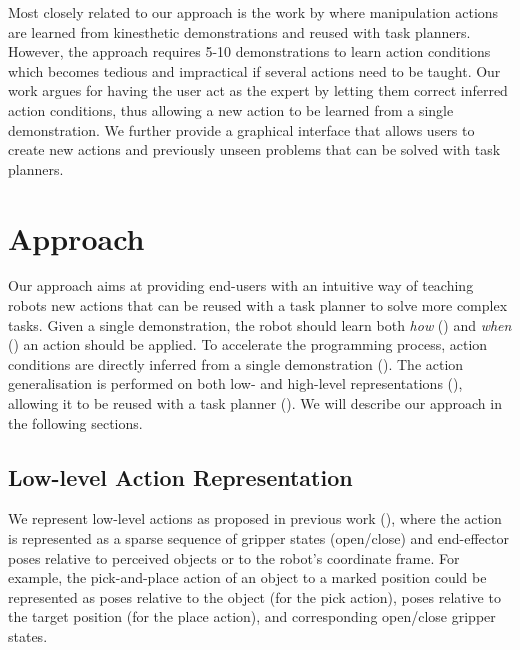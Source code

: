 Most closely related to our approach is the work by \citet{abdo2013learning} where manipulation actions are learned from kinesthetic demonstrations and reused with task planners.
However, the approach requires 5-10 demonstrations to learn action conditions which becomes tedious and impractical if several actions need to be taught.
Our work argues for having the user act as the expert by letting them correct inferred action conditions, thus allowing a new action to be learned from a single demonstration.
We further provide a graphical interface that allows users to create new actions and previously unseen problems that can be solved with task planners.


\section{Approach}
\label{sec:approach}
Our approach aims at providing end-users with an intuitive way of teaching robots new actions that can be reused with a task planner to solve more complex tasks.
Given a single demonstration, the robot should learn both \textit{how} () and \textit{when} () an action should be applied.
To accelerate the programming process, action conditions are directly inferred from a single demonstration ().
The action generalisation is performed on both low- and high-level representations (), allowing it to be reused with a task planner ().
We will describe our approach in the following sections.

\subsection{Low-level Action Representation}
\label{sec:lowlevel}
We represent low-level actions as proposed in previous work (\cite{akgun2012keyframe,alexandrova2014robot}), where the action is represented as a sparse sequence of gripper states (open/close) and end-effector poses relative to perceived objects or to the robot's coordinate frame.
For example, the pick-and-place action of an object to a marked position could be represented as poses relative to the object (for the pick action), poses relative to the target position (for the place action), and corresponding open/close gripper states. 

